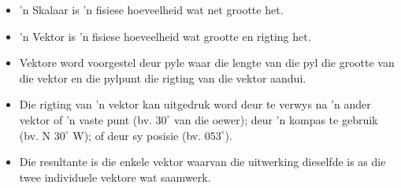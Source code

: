 % 
% 

\begin{itemize}
\item  'n Skalaar is  'n fisiese hoeveelheid wat net grootte het.
\item  'n Vektor is  'n fisiese hoeveelheid wat grootte en rigting het.
\item Vektore word voorgestel deur pyle waar die lengte van die pyl die grootte van die vektor en die pylpunt die rigting van die vektor aandui.
\item Die rigting van  'n vektor kan uitgedruk word deur te verwys na  'n ander vektor of  'n vaste punt (bv. $30^{\circ}$ van die oewer); deur  'n kompas te gebruik (bv. N $30^\circ$ W); of deur sy posisie (bv. $053 ^\circ$).
\item Die resultante is die enkele vektor waarvan die uitwerking dieselfde is as die twee individuele vektore wat saamwerk. 
\end{itemize}

